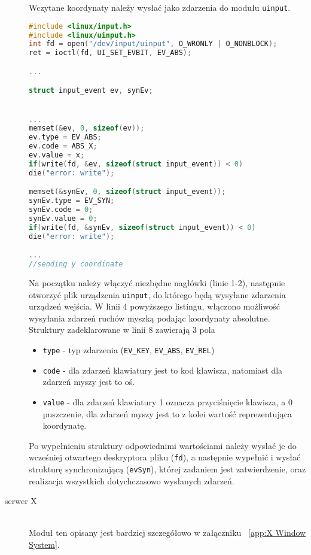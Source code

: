 \begin{description}
Wczytane koordynaty należy wysłać jako zdarzenia do modułu \lstinline{uinput}. 

\begin{lstlisting}[language=c]
#include <linux/input.h>
#include <linux/uinput.h>
int fd = open("/dev/input/uinput", O_WRONLY | O_NONBLOCK);
ret = ioctl(fd, UI_SET_EVBIT, EV_ABS);

...

struct input_event ev, synEv;


...
memset(&ev, 0, sizeof(ev));
ev.type = EV_ABS;
ev.code = ABS_X;
ev.value = x;
if(write(fd, &ev, sizeof(struct input_event)) < 0)
die("error: write");  

memset(&synEv, 0, sizeof(struct input_event));
synEv.type = EV_SYN;
synEv.code = 0;
synEv.value = 0;
if(write(fd, &synEv, sizeof(struct input_event)) < 0)
die("error: write");

...
//sending y coordinate


\end{lstlisting}
		Na początku należy włączyć niezbędne nagłówki (linie 1-2), następnie otworzyć plik urządzenia \lstinline{uinput}, do którego będą wysyłane zdarzenia urządzeń wejścia. W linii 4 powyższego listingu, włączono możliwość wysyłania zdarzeń ruchów myszką podając koordynaty absolutne. Struktury zadeklarowane w linii 8 zawierają 3 pola 
\begin{itemize}
\item \lstinline{type} - typ zdarzenia (\lstinline{EV_KEY}, \lstinline{EV_ABS}, \lstinline{EV_REL})		
\item \lstinline{code} - dla zdarzeń klawiatury jest to kod klawisza, natomiast dla zdarzeń myszy jest to oś.
\item \lstinline{value} - dla zdarzeń klawiatury 1 oznacza przyciśnięcie klawisza, a 0 puszczenie, dla zdarzeń myszy jest to z kolei wartość reprezentująca koordynatę.
\end{itemize}
		Po wypełnieniu struktury odpowiednimi wartościami należy wysłać je do wcześniej otwartego deskryptora pliku (\lstinline{fd}), a następnie wypełnić i wysłać strukturę synchronizującą (\lstinline{evSyn}), której zadaniem jest zatwierdzenie, oraz realizacja wszystkich dotychczasowo wysłanych zdarzeń. 
	\item[serwer X] \hfill \\
		Moduł ten opisany jest bardziej szczegółowo w załączniku ~\ref{app:X Window System}.


\end{description}


